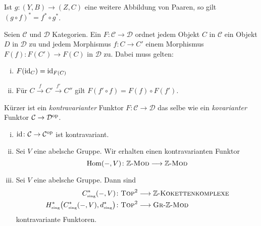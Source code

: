 \begin{bemerkung}
	Ist $g \colon (Y,B) \to (Z,C)$ eine weitere Abbildung von Paaren, so gilt $(g \circ f)^* = f^* \circ g^*$.
\end{bemerkung}

\begin{definition}[{name=[kontravarianter Funktor]}]
	Seien $\mathcal{C}$ und $\mathcal{D}$ Kategorien. Ein   $F \colon \mathcal{C} \to \mathcal{D}$ ordnet jedem Objekt $C$ in $\mathcal{C}$ ein Objekt
	$D$ in $\mathcal{D}$ zu und jedem Morphismus $f \colon C \to C'$ einem Morphismus $F(f) \colon F(C') \to F(C)$ in $\mathcal{D}$ zu. Dabei muss gelten:
	\begin{enumerate}[i)]
		\item $F(\operatorname{id}_C)= \operatorname{id}_{F(C)}$
		\item Für $C \xrightarrow{f} C' \xrightarrow{f'}C''$ gilt $F(f' \circ f) = F(f) \circ F(f')$. 
	\end{enumerate}
	Kürzer ist ein \emph{kontravarianter} Funktor $F \colon \mathcal{C} \to \mathcal{D}$ das selbe wie ein \emph{kovarianter} Funktor 
	$\mathcal{C} \to \mathcal{D}^{\mathrm{op}}$.
\end{definition}

\begin{beispiel}
	\begin{enumerate}[i)]
		\item $\operatorname{id} \colon \mathcal{C} \to \mathcal{C}^{\mathrm{op}}$ ist kontravariant.
		\item Sei $V$ eine abelsche Gruppe. Wir erhalten einen kontravarianten Funktor
		\[
			\operatorname{Hom}(-,V) \colon \mathbb{Z}\text{-}\textsc{Mod}  \longrightarrow \mathbb{Z}\text{-}\textsc{Mod}
		\]
		\item Sei $V$ eine abelsche Gruppe. Dann sind 
		\begin{align}
			C_\sing^*(-,V) &\colon \TOP^2 \longrightarrow \mathds{Z}\text{-}\textsc{Kokettenkomplexe}  \\
			H^*_\sing \enbrace*{C_\sing^*(-,V),d_\sing^*} &\colon \TOP^2 \longrightarrow \textsc{Gr}\text{-}\mathds{Z}\text{-}\MOD   
		\end{align}
		kontravariante Funktoren.
	\end{enumerate}
\end{beispiel}

